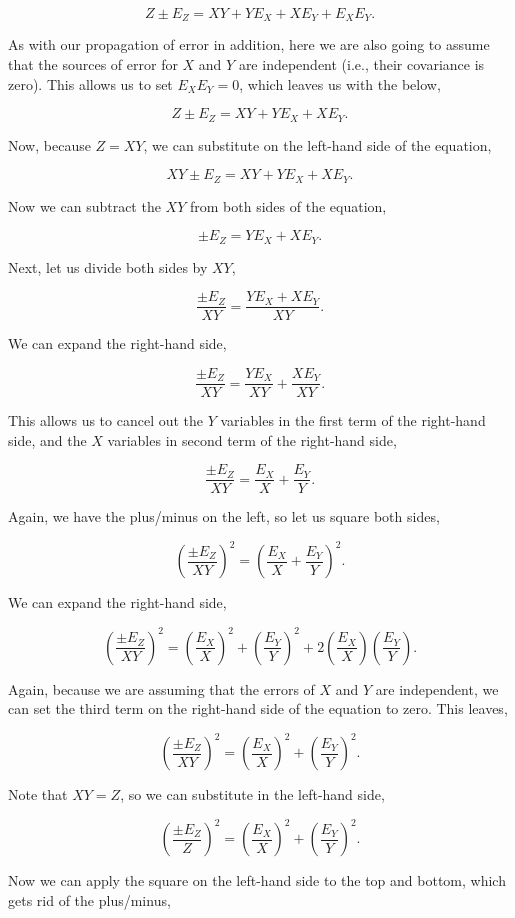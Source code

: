 \documentclass[
  openany]{krantz}
\begin{document}
\[Z \pm E_Z = XY + Y E_X + X E_Y + E_X E_Y.\]

As with our propagation of error in addition, here we are also going to assume that the sources of error for \(X\) and \(Y\) are independent (i.e., their covariance is zero).
This allows us to set \(E_{X}E_{Y} = 0\), which leaves us with the below,

\[Z \pm E_Z = XY + Y E_X + X E_Y.\]

Now, because \(Z = XY\), we can substitute on the left-hand side of the equation,

\[XY \pm E_Z = XY + Y E_X + X E_Y.\]

Now we can subtract the \(XY\) from both sides of the equation,

\[\pm E_Z = Y E_X + X E_Y.\]

Next, let us divide both sides by \(XY\),

\[\frac{\pm E_Z}{XY} = \frac{Y E_X + X E_Y}{XY}.\]

We can expand the right-hand side,

\[\frac{\pm E_Z}{XY} = \frac{Y E_X}{XY} +\frac{X E_Y}{XY}.\]

This allows us to cancel out the \(Y\) variables in the first term of the right-hand side, and the \(X\) variables in second term of the right-hand side,

\[\frac{\pm E_Z}{XY} = \frac{E_X}{X} +\frac{E_Y}{Y}.\]

Again, we have the plus/minus on the left, so let us square both sides,

\[\left(\frac{\pm E_Z}{XY}\right)^2 = \left(\frac{E_X}{X} +\frac{E_Y}{Y}\right)^2.\]

We can expand the right-hand side,

\[\left(\frac{\pm E_Z}{XY}\right)^2 = \left(\frac{E_X}{X}\right)^2 +\left(\frac{E_Y}{Y}\right)^2 + 2\left(\frac{E_X}{X}\right)\left(\frac{E_Y}{Y}\right).\]

Again, because we are assuming that the errors of \(X\) and \(Y\) are independent, we can set the third term on the right-hand side of the equation to zero.
This leaves,

\[\left(\frac{\pm E_Z}{XY}\right)^2 = \left(\frac{E_X}{X}\right)^2 +\left(\frac{E_Y}{Y}\right)^2.\]

Note that \(XY = Z\), so we can substitute in the left-hand side,

\[\left(\frac{\pm E_Z}{Z}\right)^2 = \left(\frac{E_X}{X}\right)^2 +\left(\frac{E_Y}{Y}\right)^2.\]

Now we can apply the square on the left-hand side to the top and bottom, which gets rid of the plus/minus,
\end{document}

